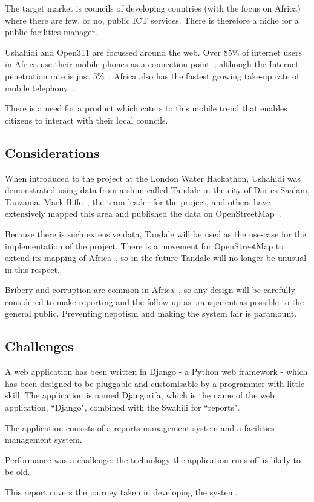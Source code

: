 The target market is councils of developing countries (with the focus on Africa) where there are few, or no, public ICT services. There is therefore a niche for a public facilities manager.

Ushahidi and Open311 are focussed around the web. Over 85\% of internet users in Africa use their mobile phones as a connection point~\cite{africainfo}; although the Internet penetration rate is just 5\%~\cite{africainfo}. Africa also has the fastest growing take-up rate of mobile telephony~\cite{africainfo}.

There is a need for a product which caters to this mobile trend that enables citizens to interact with their local councils.

\subsection{Considerations}
When introduced to the project at the London Water Hackathon, Ushahidi was demonstrated using data from a slum called Tandale in the city of Dar es Saalam, Tanzania. Mark Iliffe~\cite{markiliffe}, the team leader for the project, and others have extensively mapped this area and published the data on OpenStreetMap~\cite{openstreetmap}.

Because there is such extensive data, Tandale will be used as the use-case for the implementation of the project. There is a movement for OpenStreetMap to extend its mapping of Africa~\cite{openstreetmapafrica}, so in the future Tandale will no longer be unusual in this respect.

Bribery and corruption are common in Africa~\cite{corruption}, so any design will be carefully considered to make reporting and the follow-up as transparent as possible to the general public. Preventing nepotism and making the system fair is paramount.

\subsection{Challenges}
A web application has been written in Django - a Python web framework - which has been designed to be pluggable and customisable by a programmer with little skill. The application is named Djangorifa, which is the name of the web application, ``Django", combined with the Swahili for ``reports".

The application consists of a reports management system and a facilities management system.

Performance was a challenge: the technology the application runs off is likely to be old.

This report covers the journey taken in developing the system.